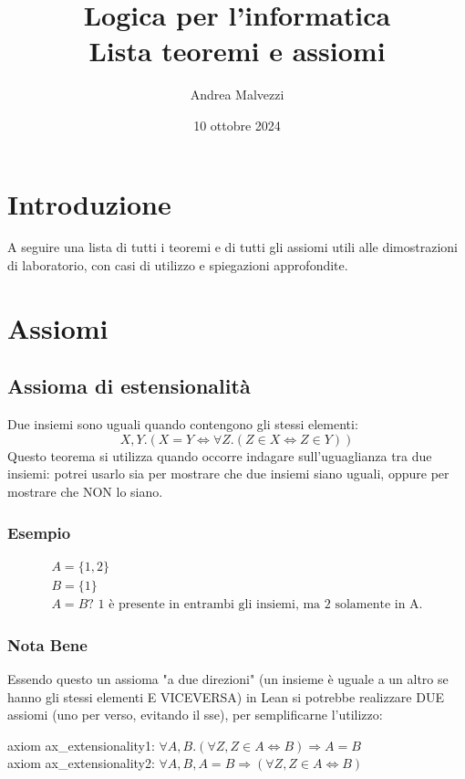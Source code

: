 \documentclass[12pt]{article}
\title{\textbf{Logica per l'informatica\\Lista teoremi e assiomi}}
\date{10 ottobre 2024}
\author{Andrea Malvezzi}
\begin{document}
\maketitle
\pagebreak
\tableofcontents
\pagebreak
\section*{Introduzione}
A seguire una lista di tutti i teoremi e di tutti gli assiomi utili alle dimostrazioni di laboratorio, con casi di utilizzo e spiegazioni approfondite.
\section{Assiomi}
\subsection{Assioma di estensionalità}
Due insiemi sono uguali quando contengono gli stessi elementi:
\begin{equation}
    X,Y.(X = Y \Leftrightarrow \forall Z.(Z \in X \Leftrightarrow Z \in Y)) \label{ass:estensionalità} \tag{ax. 1}
\end{equation}
Questo teorema si utilizza quando occorre indagare sull'uguaglianza tra due insiemi: potrei usarlo sia per mostrare che due insiemi siano uguali, oppure per mostrare che NON lo siano.
\subsubsection{Esempio}
\begin{gather*}
    A = \{1, 2\}\\
    B = \{1\}\\
    A = B? \text{ 1 è presente in entrambi gli insiemi, ma 2 solamente in A.}
\end{gather*}
\subsubsection{Nota Bene}
Essendo questo un assioma "a due direzioni" (un insieme è uguale a un altro se hanno gli stessi elementi E VICEVERSA) in Lean si potrebbe realizzare DUE assiomi (uno per verso, evitando il sse), per semplificarne l'utilizzo:
\begin{center}
    axiom ax\_extensionality1: $\forall A, B. (\forall Z, Z \in A \Leftrightarrow B) \Rightarrow A = B$\\
    axiom ax\_extensionality2: $\forall A, B, A = B \Rightarrow (\forall Z, Z \in A \Leftrightarrow B)$\\
\end{center}
\pagebreak
\end{document}
